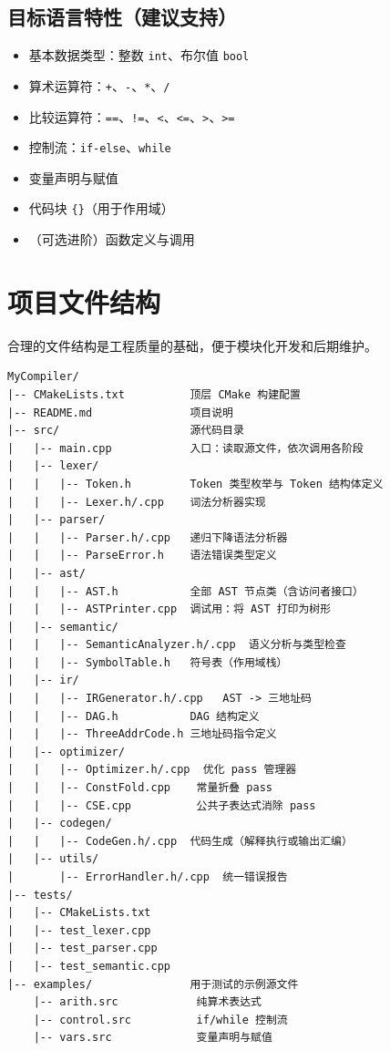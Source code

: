\documentclass[12pt, a4paper]{ctexart}
\begin{document}
\subsection{目标语言特性（建议支持）}

\begin{itemize}[noitemsep]
  \item 基本数据类型：整数 \texttt{int}、布尔值 \texttt{bool}
  \item 算术运算符：\texttt{+}、\texttt{-}、\texttt{*}、\texttt{/}
  \item 比较运算符：\texttt{==}、\texttt{!=}、\texttt{<}、\texttt{<=}、\texttt{>}、\texttt{>=}
  \item 控制流：\texttt{if-else}、\texttt{while}
  \item 变量声明与赋值
  \item 代码块 \texttt{\{\}}（用于作用域）
  \item （可选进阶）函数定义与调用
\end{itemize}

\section{项目文件结构}

合理的文件结构是工程质量的基础，便于模块化开发和后期维护。

\begin{lstlisting}[caption={推荐的项目目录结构}]
MyCompiler/
|-- CMakeLists.txt          顶层 CMake 构建配置
|-- README.md               项目说明
|-- src/                    源代码目录
|   |-- main.cpp            入口：读取源文件，依次调用各阶段
|   |-- lexer/
|   |   |-- Token.h         Token 类型枚举与 Token 结构体定义
|   |   |-- Lexer.h/.cpp    词法分析器实现
|   |-- parser/
|   |   |-- Parser.h/.cpp   递归下降语法分析器
|   |   |-- ParseError.h    语法错误类型定义
|   |-- ast/
|   |   |-- AST.h           全部 AST 节点类（含访问者接口）
|   |   |-- ASTPrinter.cpp  调试用：将 AST 打印为树形
|   |-- semantic/
|   |   |-- SemanticAnalyzer.h/.cpp  语义分析与类型检查
|   |   |-- SymbolTable.h   符号表（作用域栈）
|   |-- ir/
|   |   |-- IRGenerator.h/.cpp   AST -> 三地址码
|   |   |-- DAG.h           DAG 结构定义
|   |   |-- ThreeAddrCode.h 三地址码指令定义
|   |-- optimizer/
|   |   |-- Optimizer.h/.cpp  优化 pass 管理器
|   |   |-- ConstFold.cpp    常量折叠 pass
|   |   |-- CSE.cpp          公共子表达式消除 pass
|   |-- codegen/
|   |   |-- CodeGen.h/.cpp  代码生成（解释执行或输出汇编）
|   |-- utils/
|       |-- ErrorHandler.h/.cpp  统一错误报告
|-- tests/
|   |-- CMakeLists.txt
|   |-- test_lexer.cpp
|   |-- test_parser.cpp
|   |-- test_semantic.cpp
|-- examples/               用于测试的示例源文件
    |-- arith.src            纯算术表达式
    |-- control.src          if/while 控制流
    |-- vars.src             变量声明与赋值
\end{lstlisting}
\end{document}
